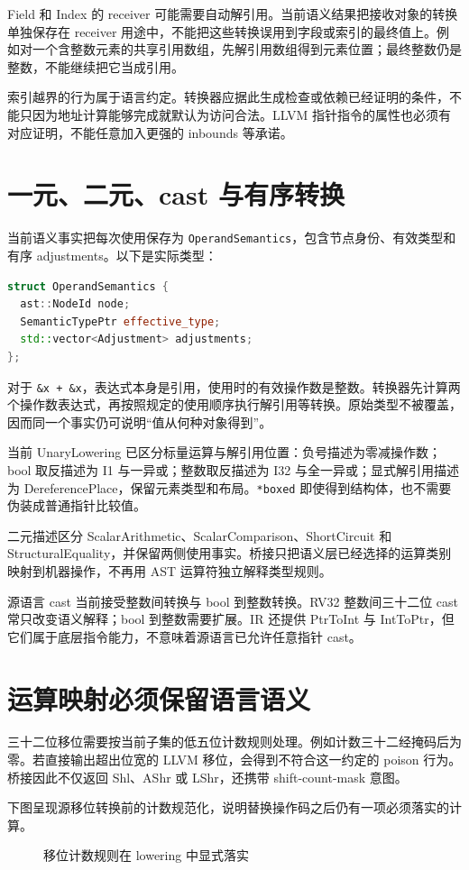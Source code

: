 Field 和 Index 的 receiver 可能需要自动解引用。当前语义结果把接收对象的转换单独保存在 receiver 用途中，不能把这些转换误用到字段或索引的最终值上。例如对一个含整数元素的共享引用数组，先解引用数组得到元素位置；最终整数仍是整数，不能继续把它当成引用。

索引越界的行为属于语言约定。转换器应据此生成检查或依赖已经证明的条件，不能只因为地址计算能够完成就默认为访问合法。LLVM 指针指令的属性也必须有对应证明，不能任意加入更强的 inbounds 等承诺。

\section{一元、二元、cast 与有序转换}
当前语义事实把每次使用保存为 \texttt{OperandSemantics}，包含节点身份、有效类型和有序 adjustments。以下是实际类型：
\begin{lstlisting}[language=C++,caption={当前操作数使用事实}]
struct OperandSemantics {
  ast::NodeId node;
  SemanticTypePtr effective_type;
  std::vector<Adjustment> adjustments;
};
\end{lstlisting}
对于 \texttt{\&x + \&x}，表达式本身是引用，使用时的有效操作数是整数。转换器先计算两个操作数表达式，再按照规定的使用顺序执行解引用等转换。原始类型不被覆盖，因而同一个事实仍可说明“值从何种对象得到”。

当前 UnaryLowering 已区分标量运算与解引用位置：负号描述为零减操作数；bool 取反描述为 I1 与一异或；整数取反描述为 I32 与全一异或；显式解引用描述为 DereferencePlace，保留元素类型和布局。\texttt{*boxed} 即使得到结构体，也不需要伪装成普通指针比较值。

二元描述区分 ScalarArithmetic、ScalarComparison、ShortCircuit 和 StructuralEquality，并保留两侧使用事实。桥接只把语义层已经选择的运算类别映射到机器操作，不再用 AST 运算符独立解释类型规则。

源语言 cast 当前接受整数间转换与 bool 到整数转换。RV32 整数间三十二位 cast 常只改变语义解释；bool 到整数需要扩展。IR 还提供 PtrToInt 与 IntToPtr，但它们属于底层指令能力，不意味着源语言已允许任意指针 cast。

\section{运算映射必须保留语言语义}
三十二位移位需要按当前子集的低五位计数规则处理。例如计数三十二经掩码后为零。若直接输出超出位宽的 LLVM 移位，会得到不符合这一约定的 poison 行为。桥接因此不仅返回 Shl、AShr 或 LShr，还携带 shift-count-mask 意图。

下图呈现源移位转换前的计数规范化，说明替换操作码之后仍有一项必须落实的计算。
\begin{figure}[htbp]\centering
{}
\caption{移位计数规则在 lowering 中显式落实}
\end{figure}

